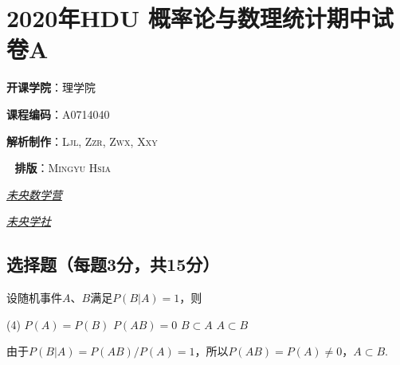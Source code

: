 \chapter{2020年\textsf{HDU} 概率论与数理统计期中试卷\textsf A}

\begin{minipage}{0.32\textwidth}
    \textbf{开课学院}：理学院
      
    \textbf{课程编码}：A0714040
\end{minipage}
\hfill
\begin{minipage}{0.32\textwidth}
    \textbf{解析制作}：\textsc{Ljl, Zzr, Zwx, Xxy}

    \textbf{\,~排版}：\textsc{Mingyu Hsia}
\end{minipage}
\hfill
\begin{minipage}{0.15\textwidth}
    \centering

    \scriptsize\href{https://qm.qq.com/q/OlkSiy9W04}{\itshape 未央数学营}
\end{minipage}
\hfill
\begin{minipage}{0.15\textwidth}
    \centering

    \scriptsize\href{http://weixin.qq.com/r/DBIABcHEqgnWKIVmb0eI}{\itshape 未央学社}
\end{minipage}

\section{选择题（每题3分，共15分）}

\begin{problem}
    设随机事件$A$、$B$满足$P(B|A)=1$，则
    \begin{tasks}(4)
        \task $P(A)=P(B)$
        \task $P(AB)=0$
        \task $B\subset A$
        \task[\true] $A\subset B$
    \end{tasks}
\end{problem}
\begin{solution}
    由于$P(B|A)=P(AB)/P(A)=1$，所以$P(AB)=P(A)\neq 0$，$A\subset B$.
\end{solution}

